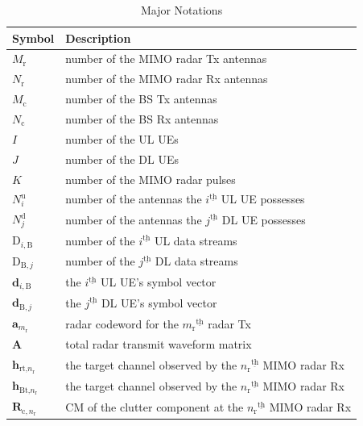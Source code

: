 \documentclass[9pt,journal]{IEEEtran}
\newcommand{\paren}[1]{\left({#1}\right)}
\newcommand{\ith}[1]    {{#1}^{\underline{\text{th}}}}
\newcommand{\rr}{_\mathrm{r}}
\newcommand{\cc}{_\mathrm{c}}
\newcommand{\B}{\textrm{B}}
\begin{document}
	\begin{table}[!t]
		\renewcommand{\arraystretch}{1.3} 
		\caption{Major Notations}
		\label{table_parameter}
		\centering
		\begin{tabular}{l||p{66mm}}
			\hline
			\bfseries Symbol & \bfseries Description\\
			\hline
			$\mathit{M}\rr$& number of the MIMO radar Tx antennas\\
			\hline
			$\mathit{N}\rr$&number of the MIMO radar Rx antennas\\
			\hline
			$\mathit{M}\cc$&number of the BS Tx antennas\\
			\hline 
			$\mathit{N}\cc$&number of the BS Rx antennas\\
			\hline
			$\mathit{I}$& number of the UL UEs\\
			\hline
			$\mathit{J}$& number of the DL UEs\\
			\hline
			$K$&number of the MIMO radar pulses %
			\\
			\hline
			$N^{\textrm{u}}_i$&number of the antennas the $\ith{i}$ UL UE possesses \\
			\hline
			$\mathit{N}^\textrm{d}_j$&number of the antennas the $\ith{j}$ DL UE possesses \\
			\hline
			$\mathrm{D}_{i,\B}$&number of the $\ith{i}$ UL data streams \\
			\hline
			$\mathrm{D}_{\B,j}$&number of the $\ith{j}$ DL data streams\\
			\hline
			$\mathbf{d}_{i,\B}$&the $\ith{i}$ UL UE's symbol vector  \\
			\hline
			$\mathbf{d}_{\B,j}$&the $\ith{j}$ DL UE's symbol vector \\
			\hline
			$\mathbf{a}_{m\rr}$& radar codeword for the $\ith{m\rr}$ radar Tx\\
			\hline
			$\mathbf{A}$& total radar transmit waveform matrix\\
			\hline
			$\mathbf{h}_{\text{rt,}n\rr}$& the target channel observed by the $\ith{n\rr}$ MIMO radar Rx\\
			\hline
			$\mathbf{h}_{\text{Bt,}n\rr}$& the target channel observed by the $\ith{n\rr}$ MIMO radar Rx\\
			\hline
			$\mathbf{R}_{\textrm{c},n\rr}$& CM of the clutter component at the $\ith{n\rr}$ MIMO radar Rx \\
			\hline

\end{tabular}
\end{table}
\end{document}

